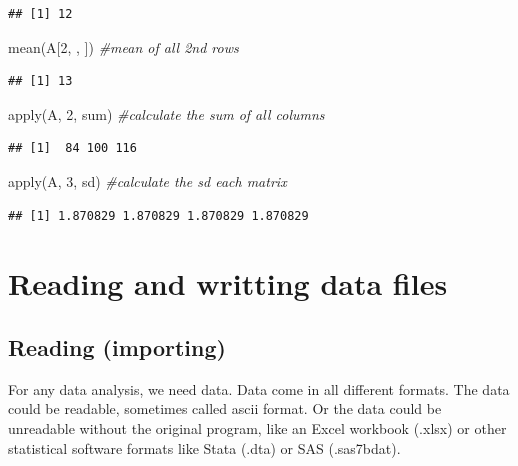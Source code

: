 \documentclass[
]{book}
\newenvironment{Shaded}{\begin{snugshade}}{\end{snugshade}}
\newcommand{\CommentTok}[1]{\textcolor[rgb]{0.56,0.35,0.01}{\textit{#1}}}
\newcommand{\DecValTok}[1]{\textcolor[rgb]{0.00,0.00,0.81}{#1}}
\newcommand{\FunctionTok}[1]{\textcolor[rgb]{0.00,0.00,0.00}{#1}}
\newcommand{\NormalTok}[1]{#1}
\begin{document}
\begin{verbatim}
## [1] 12
\end{verbatim}

\begin{Shaded}
\begin{Highlighting}[]
\FunctionTok{mean}\NormalTok{(A[}\DecValTok{2}\NormalTok{, , ])         }\CommentTok{\#mean of all 2nd rows}
\end{Highlighting}
\end{Shaded}

\begin{verbatim}
## [1] 13
\end{verbatim}

\begin{Shaded}
\begin{Highlighting}[]
\FunctionTok{apply}\NormalTok{(A, }\DecValTok{2}\NormalTok{, sum)       }\CommentTok{\#calculate the sum of all columns}
\end{Highlighting}
\end{Shaded}

\begin{verbatim}
## [1]  84 100 116
\end{verbatim}

\begin{Shaded}
\begin{Highlighting}[]
\FunctionTok{apply}\NormalTok{(A, }\DecValTok{3}\NormalTok{, sd)        }\CommentTok{\#calculate the sd each matrix}
\end{Highlighting}
\end{Shaded}

\begin{verbatim}
## [1] 1.870829 1.870829 1.870829 1.870829
\end{verbatim}

\hypertarget{reading-and-writting-data-files}{%
\chapter{Reading and writting data files}\label{reading-and-writting-data-files}}

\hypertarget{reading-importing}{%
\section{Reading (importing)}\label{reading-importing}}

For any data analysis, we need data. Data come in all different formats. The data could be readable, sometimes called ascii format. Or the data could be unreadable without the original program, like an Excel workbook (.xlsx) or other statistical software formats like Stata (.dta) or SAS (.sas7bdat).
\end{document}
